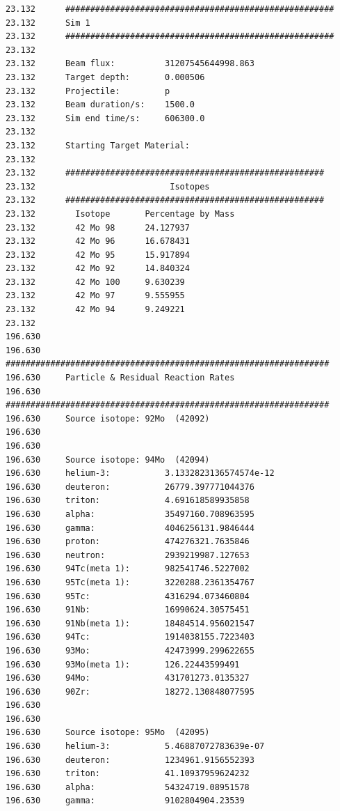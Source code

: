 \begin{lstlisting}[style=sOutputFile,caption={Final results for Molybdenum Irradiation},label={listing:activityv2molybdenum}]
23.132      ######################################################
23.132      Sim 1
23.132      ######################################################
23.132      
23.132      Beam flux:          31207545644998.863
23.132      Target depth:       0.000506
23.132      Projectile:         p
23.132      Beam duration/s:    1500.0
23.132      Sim end time/s:     606300.0
23.132      
23.132      Starting Target Material:
23.132      
23.132      ####################################################
23.132                           Isotopes                       
23.132      ####################################################
23.132        Isotope       Percentage by Mass  
23.132        42 Mo 98      24.127937
23.132        42 Mo 96      16.678431
23.132        42 Mo 95      15.917894
23.132        42 Mo 92      14.840324
23.132        42 Mo 100     9.630239
23.132        42 Mo 97      9.555955
23.132        42 Mo 94      9.249221
23.132        
196.630     
196.630     #################################################################
196.630     Particle & Residual Reaction Rates
196.630     #################################################################
196.630     Source isotope: 92Mo  (42092)
196.630     
196.630     
196.630     Source isotope: 94Mo  (42094)
196.630     helium-3:           3.1332823136574574e-12
196.630     deuteron:           26779.397771044376
196.630     triton:             4.691618589935858
196.630     alpha:              35497160.708963595
196.630     gamma:              4046256131.9846444
196.630     proton:             474276321.7635846
196.630     neutron:            2939219987.127653
196.630     94Tc(meta 1):       982541746.5227002
196.630     95Tc(meta 1):       3220288.2361354767
196.630     95Tc:               4316294.073460804
196.630     91Nb:               16990624.30575451
196.630     91Nb(meta 1):       18484514.956021547
196.630     94Tc:               1914038155.7223403
196.630     93Mo:               42473999.299622655
196.630     93Mo(meta 1):       126.22443599491
196.630     94Mo:               431701273.0135327
196.630     90Zr:               18272.130848077595
196.630     
196.630     
196.630     Source isotope: 95Mo  (42095)
196.630     helium-3:           5.46887072783639e-07
196.630     deuteron:           1234961.9156552393
196.630     triton:             41.10937959624232
196.630     alpha:              54324719.08951578
196.630     gamma:              9102804904.23539

\end{lstlisting}
